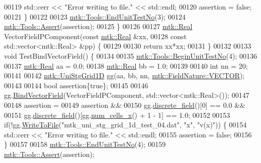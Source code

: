 \begin{DoxyCode}
00119     std::cerr << \textcolor{stringliteral}{"Error writing to file."} << std::endl;
00120     assertion = \textcolor{keyword}{false};
00121   \}
00122 
00123   \hyperlink{classmtk_1_1Tools_aba67d9dc35c9c1c49430fcc9ea035e03}{mtk::Tools::EndUnitTestNo}(3);
00124   \hyperlink{classmtk_1_1Tools_ac6804df469c94ab6a796fb64f1e44a89}{mtk::Tools::Assert}(assertion);
00125 \}
00126 
00127 \hyperlink{group__c01-roots_gac080bbbf5cbb5502c9f00405f894857d}{mtk::Real} VectorFieldPComponent(\textcolor{keyword}{const} \hyperlink{group__c01-roots_gac080bbbf5cbb5502c9f00405f894857d}{mtk::Real} &xx,
00128                                 \textcolor{keyword}{const} std::vector<mtk::Real> &pp) \{
00129 
00130   \textcolor{keywordflow}{return} xx*xx;
00131 \}
00132 
00133 \textcolor{keywordtype}{void} TestBindVectorField() \{
00134 
00135   \hyperlink{classmtk_1_1Tools_afc29ecaf337a13ed2e817d3890a5a441}{mtk::Tools::BeginUnitTestNo}(4);
00136 
00137   \hyperlink{group__c01-roots_gac080bbbf5cbb5502c9f00405f894857d}{mtk::Real} aa = 0.0;
00138   \hyperlink{group__c01-roots_gac080bbbf5cbb5502c9f00405f894857d}{mtk::Real} bb = 1.0;
00139 
00140   \textcolor{keywordtype}{int} nn = 20;
00141 
00142   \hyperlink{classmtk_1_1UniStgGrid1D}{mtk::UniStgGrid1D} gg(aa, bb, nn, \hyperlink{namespacemtk_ga4c54f2a329cfb4e56213b02a259d19e2a87752381b583740610f1dfeb07fdad7e}{mtk::FieldNature::VECTOR});
00143 
00144   \textcolor{keywordtype}{bool} assertion\{\textcolor{keyword}{true}\};
00145 
00146   gg.\hyperlink{classmtk_1_1UniStgGrid1D_ac6f8c592636dfa5a92217ac82405976d}{BindVectorField}(VectorFieldPComponent, std::vector<mtk::Real>());
00147 
00148   assertion =
00149     assertion &&
00150     gg.\hyperlink{classmtk_1_1UniStgGrid1D_ab9c3f9ee2ac76a351b01e4abfede4d19}{discrete\_field}()[0] == 0.0 &&
00151     gg.\hyperlink{classmtk_1_1UniStgGrid1D_ab9c3f9ee2ac76a351b01e4abfede4d19}{discrete\_field}()[gg.\hyperlink{classmtk_1_1UniStgGrid1D_af1b3729d8afa07be5b2775ed68015b80}{num\_cells\_x}() + 1 - 1] == 1.0;
00152 
00153   \textcolor{keywordflow}{if}(!gg.\hyperlink{classmtk_1_1UniStgGrid1D_a6d2c10aa9468a037829f0eb043b898dc}{WriteToFile}(\textcolor{stringliteral}{"mtk\_uni\_stg\_grid\_1d\_test\_04.dat"}, \textcolor{stringliteral}{"x"}, \textcolor{stringliteral}{"v(x)"})) \{
00154     std::cerr << \textcolor{stringliteral}{"Error writing to file."} << std::endl;
00155     assertion = \textcolor{keyword}{false};
00156   \}
00157 
00158   \hyperlink{classmtk_1_1Tools_aba67d9dc35c9c1c49430fcc9ea035e03}{mtk::Tools::EndUnitTestNo}(4);
00159   \hyperlink{classmtk_1_1Tools_ac6804df469c94ab6a796fb64f1e44a89}{mtk::Tools::Assert}(assertion);

\end{DoxyCode}
